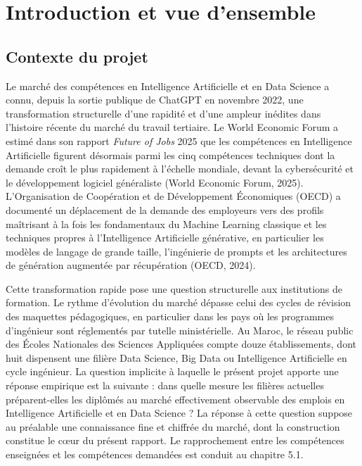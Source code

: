 \documentclass[11pt,a4paper,openany]{report}
\begin{document}
\setcounter{tocdepth}{2}

{\hypersetup{linkcolor=navy}
  \tableofcontents
}
\clearpage

\listoffigures
\clearpage

\listoftables
\clearpage


\chapter{Introduction et vue d'ensemble}

\section{Contexte du projet}

Le march\'e des comp\'etences en Intelligence Artificielle et en Data Science a connu, depuis la sortie publique de ChatGPT en novembre 2022, une transformation structurelle d'une rapidit\'e et d'une ampleur in\'edites dans l'histoire r\'ecente du march\'e du travail tertiaire. Le World Economic Forum a estim\'e dans son rapport \emph{Future of Jobs} 2025 que les comp\'etences en Intelligence Artificielle figurent d\'esormais parmi les cinq comp\'etences techniques dont la demande cro\^it le plus rapidement \`a l'\'echelle mondiale, devant la cybers\'ecurit\'e et le d\'eveloppement logiciel g\'en\'eraliste (World Economic Forum, 2025). L'Organisation de Coop\'eration et de D\'eveloppement \'Economiques (OECD) a document\'e un d\'eplacement de la demande des employeurs vers des profils ma\^itrisant \`a la fois les fondamentaux du Machine Learning classique et les techniques propres \`a l'Intelligence Artificielle g\'en\'erative, en particulier les mod\`eles de langage de grande taille, l'ing\'enierie de prompts et les architectures de g\'en\'eration augment\'ee par r\'ecup\'eration (OECD, 2024).

Cette transformation rapide pose une question structurelle aux institutions de formation. Le rythme d'\'evolution du march\'e d\'epasse celui des cycles de r\'evision des maquettes p\'edagogiques, en particulier dans les pays o\`u les programmes d'ing\'enieur sont r\'eglement\'es par tutelle minist\'erielle. Au Maroc, le r\'eseau public des \'Ecoles Nationales des Sciences Appliqu\'ees compte douze \'etablissements, dont huit dispensent une fili\`ere Data Science, Big Data ou Intelligence Artificielle en cycle ing\'enieur. La question implicite \`a laquelle le pr\'esent projet apporte une r\'eponse empirique est la suivante : dans quelle mesure les fili\`eres actuelles pr\'eparent-elles les dipl\^om\'es au march\'e effectivement observable des emplois en Intelligence Artificielle et en Data Science ? La r\'eponse \`a cette question suppose au pr\'ealable une connaissance fine et chiffr\'ee du march\'e, dont la construction constitue le c\oe ur du pr\'esent rapport. Le rapprochement entre les comp\'etences enseign\'ees et les comp\'etences demand\'ees est conduit au chapitre 5.1.
\end{document}
